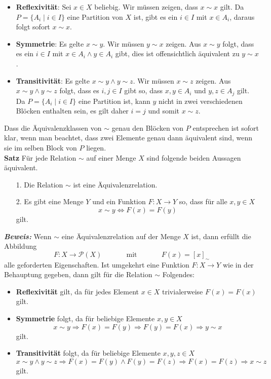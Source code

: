 \begin{itemize}
	\item \textbf{Reflexivität}: Sei $x\in X$  beliebig. Wir müssen zeigen, dass $x\sim x$ gilt. Da $P=\{A_i\mid i\in I\}$ eine Partition von $X$ ist, gibt es ein $i\in I$ mit $x\in A_i$, daraus folgt sofort $x\sim x$.
	\item \textbf{Symmetrie}: Es gelte $x\sim y$. Wir müssen $y\sim x$ zeigen. Aus $x\sim y$ folgt, dass es ein $i\in I$ mit $x\in A_i\land y\in A_i$ gibt, dies ist offensichtlich äquivalent zu $y\sim x$.
	\item \textbf{Transitivität}: Es gelte $x\sim y\land y\sim z$. Wir müssen $x\sim z$ zeigen. Aus $x\sim y\land y\sim z$ folgt, dass es $i,j\in I$ gibt so, dass $x,y\in A_i$ und $y,z\in A_j$ gilt. Da $P=\{A_i\mid i\in I\}$ eine Partition ist, kann $y $ nicht in zwei verschiedenen Blöcken enthalten sein, es gilt daher $i=j$ und somit $x\sim z$.
\end{itemize}
Dass die Äquivalenzklassen von $\sim$ genau den Blöcken von $P$ entsprechen ist sofort klar, wenn man beachtet, dass
zwei Elemente genau dann äquivalent sind, wenn sie im selben Block von $P$ liegen.\\
\textbf{Satz }
Für jede Relation $\sim$ auf einer Menge $X$ sind folgende beiden Aussagen äquivalent.
\begin{enumerate}
	\item[1.] Die Relation $\sim$ ist eine Äquivalenzrelation.
	\item[2.] Es gibt eine Menge $Y$ und ein Funktion $F:X\to Y$ so, dass für alle $x,y\in X$
	      \[
		      x\sim y\Leftrightarrow F(x)=F(y)
	      \]
	      gilt.
\end{enumerate}
\textbf{\textit{Beweis: }}
Wenn $\sim$ eine Äquivalenzrelation auf der Menge $X$ ist, dann erfüllt die Abbildung
\[
	F:X\to\mathcal{P}(X)\phantom{abstand}\text{mit} \phantom{abstand} F(x)=[x]_\sim
\]
alle geforderten Eigenschaften. Ist umgekehrt eine Funktion $F:X\to Y$ wie in der Behauptung gegeben, dann gilt für die Relation $\sim$ Folgendes:
\begin{itemize}
	\item\textbf{Reflexivität} gilt, da für jedes Element $x\in X$ trivialerweise $F(x)=F(x)$ gilt.
	\item \textbf{Symmetrie} folgt, da für beliebige Elemente $x,y\in X$
	      \[
		      x\sim y\Rightarrow F(x)=F(y)\Rightarrow F(y)=F(x)\Rightarrow y\sim x
	      \]
	      gilt.
	\item\textbf{Transitivität} folgt, da für beliebige Elemente $x,y,z\in X$
	      \[
		      x\sim y\land y\sim z\Rightarrow F(x)=F(y)\land F(y)=F(z)\Rightarrow F(x)=F(z)\Rightarrow  x\sim z
	      \]
	      gilt.
\end{itemize}

